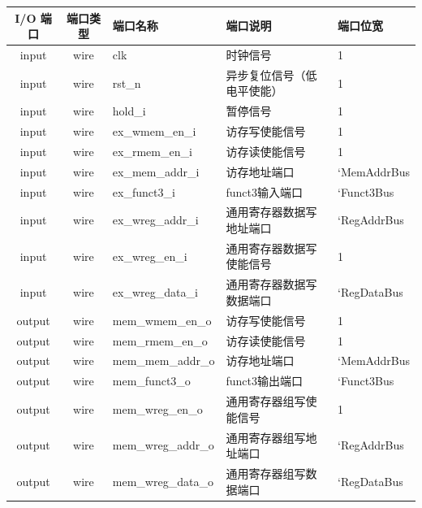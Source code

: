 \documentclass[lang=cn,11pt,a4paper,chinesefont=founder]{elegantpaper}
\begin{document}
\begin{tabular}{cclll}
    \toprule
    I/O 端口 & 端口类型 & 端口名称           & 端口说明                   & 端口位宽    \\
    \midrule
    input    & wire     & clk                & 时钟信号                   & 1           \\
    input    & wire     & rst\_n             & 异步复位信号（低电平使能） & 1           \\
    input    & wire     & hold\_i            & 暂停信号                   & 1           \\

    input    & wire     & ex\_wmem\_en\_i    & 访存写使能信号             & 1           \\
    input    & wire     & ex\_rmem\_en\_i    & 访存读使能信号             & 1           \\
    input    & wire     & ex\_mem\_addr\_i   & 访存地址端口               & `MemAddrBus \\
    input    & wire     & ex\_funct3\_i      & funct3输入端口             & `Funct3Bus  \\
    input    & wire     & ex\_wreg\_addr\_i  & 通用寄存器数据写地址端口   & `RegAddrBus \\
    input    & wire     & ex\_wreg\_en\_i    & 通用寄存器数据写使能信号   & 1           \\
    input    & wire     & ex\_wreg\_data\_i  & 通用寄存器数据写数据端口   & `RegDataBus \\

    output   & wire     & mem\_wmem\_en\_o   & 访存写使能信号             & 1           \\
    output   & wire     & mem\_rmem\_en\_o   & 访存读使能信号             & 1           \\
    output   & wire     & mem\_mem\_addr\_o  & 访存地址端口               & `MemAddrBus \\
    output   & wire     & mem\_funct3\_o     & funct3输出端口             & `Funct3Bus  \\
    output   & wire     & mem\_wreg\_en\_o   & 通用寄存器组写使能信号     & 1           \\
    output   & wire     & mem\_wreg\_addr\_o & 通用寄存器组写地址端口     & `RegAddrBus \\
    output   & wire     & mem\_wreg\_data\_o & 通用寄存器组写数据端口     & `RegDataBus \\
    \bottomrule
\end{tabular}\\
\end{document}
